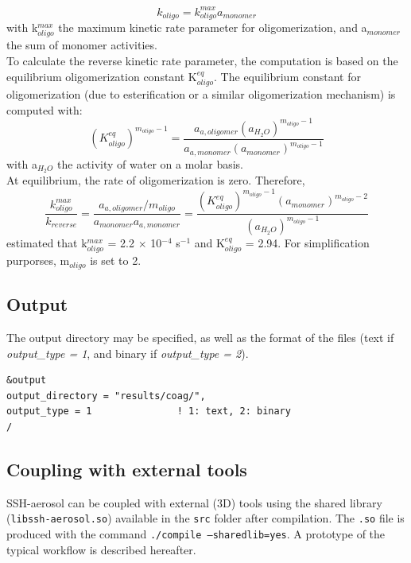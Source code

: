 \documentclass[a4paper,11pt]{article}
\begin{document}
\begin{equation}
k_{oligo}=k^{max}_{oligo} a_{monomer} %
\label{oligo_kin}
\end{equation}
with k$^{max}_{oligo}$ the maximum kinetic rate parameter for oligomerization, and a$_{monomer}$ the sum of monomer activities.\\
\indent To calculate the reverse kinetic rate parameter, the computation is based on the equilibrium oligomerization constant K$^{eq}_{oligo}$. The equilibrium constant for oligomerization (due to esterification or a similar oligomerization mechanism) is computed with:
\begin{equation}
(K^{eq}_{oligo})^{m_{oligo}-1}=\frac{a_{a,oligomer}(a_{H_2O})^{m_{oligo}-1}}{a_{a,monomer}(a_{monomer})^{m_{oligo}-1}}
\label{keq_oligo}
\end{equation}
with a$_{H_2O}$ the activity of water on a molar basis.\\
At equilibrium, the rate of oligomerization is zero. Therefore,
\begin{equation}
\frac{k^{max}_{oligo}}{k_{reverse}} = \frac{a_{a,oligomer}/{m_{oligo}}}{a_{monomer}a_{a,monomer}} =\frac{(K^{eq}_{oligo})^{m_{oligo}-1}(a_{monomer})^{m_{oligo}-2}}{(a_{H_2O})^{m_{oligo}-1}}
\label{oligo_eq}
\end{equation}
\cite{couvidat2018} estimated that k$^{max}_{oligo}$ = 2.2 $\times$ 10$^{-4}$ s$^{-1}$ and K$^{eq}_{oligo}$ = 2.94. For simplification purporses, m$_{oligo}
$ is set to 2.




\subsection{Output}

The output directory may be specified, as well as the format of the files (text if {\textit{output\_type = 1}}, and binary if {\textit{output\_type = 2}}).
 
\begin{verbatim}
&output
output_directory = "results/coag/", 
output_type = 1               ! 1: text, 2: binary
/
\end{verbatim}

\subsection{Coupling with external tools}

SSH-aerosol can be coupled with external (3D) tools using the shared library (\texttt{libssh-aerosol.so}) available in the \texttt{src} folder after compilation.
The \texttt{.so} file is produced with the command \texttt{./compile --sharedlib=yes}.
A prototype of the typical workflow is described hereafter.
\end{document}

